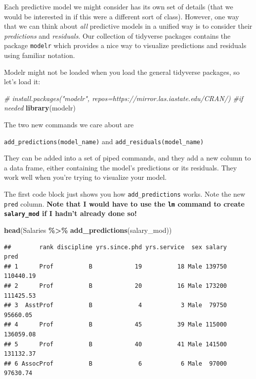 \documentclass[
]{article}
\newenvironment{Shaded}{\begin{snugshade}}{\end{snugshade}}
\newcommand{\CommentTok}[1]{\textcolor[rgb]{0.56,0.35,0.01}{\textit{#1}}}
\newcommand{\FunctionTok}[1]{\textcolor[rgb]{0.13,0.29,0.53}{\textbf{#1}}}
\newcommand{\NormalTok}[1]{#1}
\newcommand{\SpecialCharTok}[1]{\textcolor[rgb]{0.81,0.36,0.00}{\textbf{#1}}}
\begin{document}
Each predictive model we might consider has its own set of details (that
we would be interested in if this were a different sort of class).
However, one way that we can think about \emph{all} predictive models in
a unified way is to consider their \emph{predictions} and
\emph{residuals}. Our collection of tidyverse packages contains the
package \texttt{modelr} which provides a nice way to visualize
predictions and residuals using familiar notation.

Modelr might not be loaded when you load the general tidyverse packages,
so let's load it:

\begin{Shaded}
\begin{Highlighting}[]
\CommentTok{\# install.packages("modelr", repos=\textquotesingle{}https://mirror.las.iastate.edu/CRAN/)  \#if needed}
\FunctionTok{library}\NormalTok{(modelr)}
\end{Highlighting}
\end{Shaded}

The two new commands we care about are

\texttt{add\_predictions(model\_name)} and
\texttt{add\_residuals(model\_name)}

They can be added into a set of piped commands, and they add a new
column to a data frame, either containing the model's predictions or its
residuals. They work well when you're trying to visualize your model.

The first code block just shows you how \texttt{add\_predictions} works.
Note the new \texttt{pred} column. \textbf{Note that I would have to use
the \texttt{lm} command to create \texttt{salary\_mod} if I hadn't
already done so!}

\begin{Shaded}
\begin{Highlighting}[]
\FunctionTok{head}\NormalTok{(Salaries }\SpecialCharTok{\%\textgreater{}\%} \FunctionTok{add\_predictions}\NormalTok{(salary\_mod))}
\end{Highlighting}
\end{Shaded}

\begin{verbatim}
##        rank discipline yrs.since.phd yrs.service  sex salary      pred
## 1      Prof          B            19          18 Male 139750 110440.19
## 2      Prof          B            20          16 Male 173200 111425.53
## 3  AsstProf          B             4           3 Male  79750  95660.05
## 4      Prof          B            45          39 Male 115000 136059.08
## 5      Prof          B            40          41 Male 141500 131132.37
## 6 AssocProf          B             6           6 Male  97000  97630.74
\end{verbatim}
\end{document}
